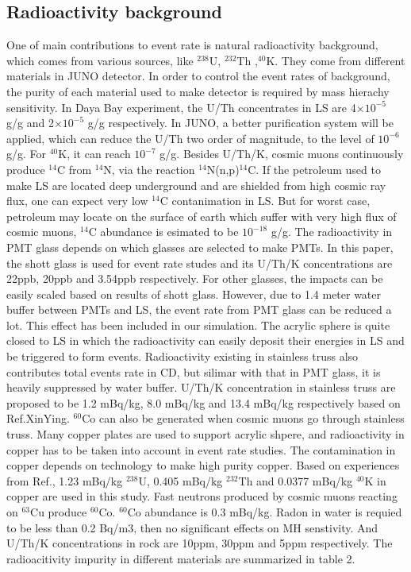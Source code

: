 \documentclass[a4paper,10pt,twoside]{paper}
\begin{document}
\begin{multicols}{2}
                \subsection{Radioactivity background}
                One of main contributions to event rate is natural radioactivity background, which comes from various sources, like $^{238}$U, $^{232}$Th ,$^{40}$K. 
                They come from different materials in JUNO detector. In order to control the event rates of background, the purity of each material used to make detector is required by mass hierachy sensitivity.
		In Daya Bay experiment, the U/Th concentrates in LS are 4$\times10^{-5}$ g/g and 2$\times10^{-5}$ g/g respectively.
		In JUNO, a better purification system will be applied, which can reduce the U/Th two order of magnitude, to the level of $10^{-6}$ g/g. For $^{40}$K, it can reach $10^{-7}$ g/g. 
		Besides U/Th/K, cosmic muons continuously produce $^{14}$C from $^{14}$N, via the reaction $^{14}$N(n,p)$^{14}$C.
		If the petroleum used to make LS are located deep underground and are shielded from high cosmic ray flux, one can expect very low $^{14}$C contanimation in LS. 
		But for worst case, petroleum may locate on the surface of earth which suffer with very high flux of cosmic muons, $^{14}$C abundance is esimated to be $10^{-18}$ g/g.
		The radioactivity in PMT glass depends on which glasses are selected to make PMTs.
		In this paper, the shott glass is used for event rate studes and its U/Th/K concentrations are 22ppb, 20ppb and 3.54ppb respectively.
		For other glasses, the impacts can be easily scaled based on results of shott glass. 
		However, due to 1.4 meter water buffer between PMTs and LS, the event rate from PMT glass can be reduced a lot. This effect has been included in our simulation.
                The acrylic sphere is quite closed to LS in which the radioactivity can easily deposit their energies in LS and be triggered to form events.
                Radioactivity existing in stainless truss also contributes total events rate in CD, but silimar with that in PMT glass, it is heavily suppressed by water buffer.
                U/Th/K concentration in stainless truss are proposed to be 1.2 mBq/kg, 8.0 mBq/kg and 13.4 mBq/kg respectively based on Ref.XinYing.
		$^{60}$Co can also be generated when cosmic muons go through stainless truss.
                Many copper plates are used to support acrylic shpere, and radioactivity in copper has to be taken into account in event rate studies.
		The contamination in copper depends on technology to make high purity copper. Based on experiences from Ref., 1.23 mBq/kg $^{238}$U, 0.405 mBq/kg $^{232}$Th and 0.0377 mBq/kg $^{40}$K in copper are used in this study. 
		Fast neutrons produced by cosmic muons reacting on $^{63}$Cu produce $^{60}$Co. $^{60}$Co abundance is 0.3 mBq/kg.
                Radon in water is requied to be less than 0.2 Bq/m3, then no significant effects on MH senstivity. And U/Th/K concentrations in rock are 10ppm, 30ppm and 5ppm respectively.
                The radioacitivity impurity in different materials are summarized in table 2. 

	\end{multicols}
\end{document}
